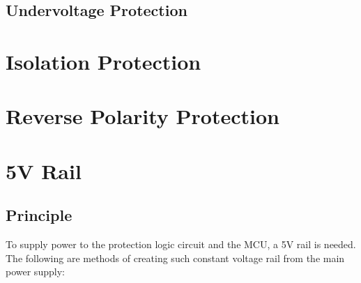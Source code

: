 \documentclass[main.tex]{subfiles}
\begin{document}
    \subsection{Undervoltage Protection}
    
    \section{Isolation Protection}

    \section{Reverse Polarity Protection}

    \pagebreak

    \section{5V Rail}

    \subsection{Principle}
    \justify
    To supply power to the protection logic circuit and the MCU, a 5V rail is needed. The following are methods of creating such constant voltage rail from the main power supply:
\end{document}
